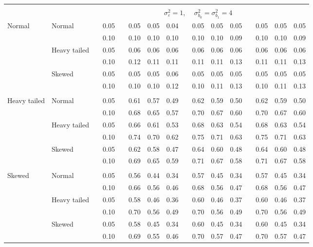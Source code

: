 \documentclass{article} %
\begin{document}
\begin{table}[ht]
\begin{scriptsize}
\begin{center}
\begin{tabular}{ll p{.1cm} c p{.1cm} rrr p{.1cm} rrr p{.1cm} rrr}
&&&&&&&&&&&&&&&\\
& && && \multicolumn{9}{c}{$\sigma_{\varepsilon}^2 = 1$, \ \ $\sigma_{b_0}^2 = \sigma_{b_1}^2 = 4$} \\ \cline{6-16}
\rowcolor{gray!20}Normal       & Normal       && 0.05 &&   0.05 & 0.05 & 0.04 && 0.05 & 0.05 & 0.05 && 0.05 & 0.05 & 0.05 \\ 
\rowcolor{gray!20}             &              && 0.10 &&   0.10 & 0.10 & 0.10 && 0.10 & 0.10 & 0.09 && 0.10 & 0.10 & 0.09 \\ 
\rowcolor{gray!20}             & Heavy tailed && 0.05 &&   0.06 & 0.06 & 0.06 && 0.06 & 0.06 & 0.06 && 0.06 & 0.06 & 0.06 \\ 
\rowcolor{gray!20}             &              && 0.10 &&   0.12 & 0.11 & 0.11 && 0.11 & 0.11 & 0.13 && 0.11 & 0.11 & 0.13 \\ 
\rowcolor{gray!20}             & Skewed       && 0.05 &&   0.05 & 0.05 & 0.06 && 0.05 & 0.05 & 0.05 && 0.05 & 0.05 & 0.05 \\ 
\rowcolor{gray!20}             &              && 0.10 &&   0.10 & 0.10 & 0.12 && 0.10 & 0.11 & 0.13 && 0.10 & 0.11 & 0.13 \\ 
             &&&&&&&&&&&&&&&\\
Heavy tailed & Normal       && 0.05 &&   0.61 & 0.57 & 0.49 && 0.62 & 0.59 & 0.50 && 0.62 & 0.59 & 0.50 \\ 
             &              && 0.10 &&   0.68 & 0.65 & 0.57 && 0.70 & 0.67 & 0.60 && 0.70 & 0.67 & 0.60 \\ 
             & Heavy tailed && 0.05 &&   0.66 & 0.61 & 0.53 && 0.68 & 0.63 & 0.54 && 0.68 & 0.63 & 0.54 \\ 
             &              && 0.10 &&   0.74 & 0.70 & 0.62 && 0.75 & 0.71 & 0.63 && 0.75 & 0.71 & 0.63 \\ 
             & Skewed       && 0.05 &&   0.62 & 0.58 & 0.47 && 0.64 & 0.60 & 0.48 && 0.64 & 0.60 & 0.48 \\ 
             &              && 0.10 &&   0.69 & 0.65 & 0.59 && 0.71 & 0.67 & 0.58 && 0.71 & 0.67 & 0.58 \\ 
             &&&&&&&&&&&&&&&\\
Skewed       & Normal       && 0.05 &&   0.56 & 0.44 & 0.34 && 0.57 & 0.45 & 0.34 && 0.57 & 0.45 & 0.34 \\ 
             &              && 0.10 &&   0.66 & 0.56 & 0.46 && 0.68 & 0.56 & 0.47 && 0.68 & 0.56 & 0.47 \\ 
             & Heavy tailed && 0.05 &&   0.58 & 0.46 & 0.36 && 0.60 & 0.46 & 0.37 && 0.60 & 0.46 & 0.37 \\ 
             &              && 0.10 &&   0.70 & 0.56 & 0.49 && 0.70 & 0.56 & 0.49 && 0.70 & 0.56 & 0.49 \\ 
             & Skewed       && 0.05 &&   0.58 & 0.45 & 0.34 && 0.60 & 0.45 & 0.34 && 0.60 & 0.45 & 0.34 \\ 
             &              && 0.10 &&   0.69 & 0.55 & 0.46 && 0.70 & 0.57 & 0.47 && 0.70 & 0.57 & 0.47 \\ 


\end{tabular}
\end{center}
\end{scriptsize}
\end{table}
\end{document}
